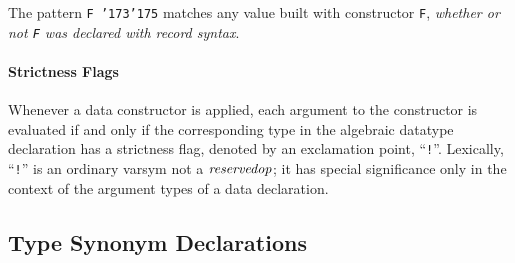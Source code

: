 The pattern \mbox{\tt F\ {\char'173}{\char'175}} matches any value built with constructor \mbox{\tt F}, 
{\em whether or not \mbox{\tt F} was declared with record syntax}. 

\paragraph{Strictness Flags}
\label{strictness-flags}
Whenever a data constructor is applied, each argument to the
constructor is evaluated if and only if the corresponding type in the
algebraic datatype declaration has a strictness flag, denoted by
an exclamation point, ``\mbox{\tt !}''.
Lexically, ``\mbox{\tt !}'' is an ordinary varsym not a \mbox{$\it reservedop$}; 
it has special significance only in the context of the argument types of 
a data declaration.




\subsection{Type Synonym Declarations}
\label{type-synonym-decls}

